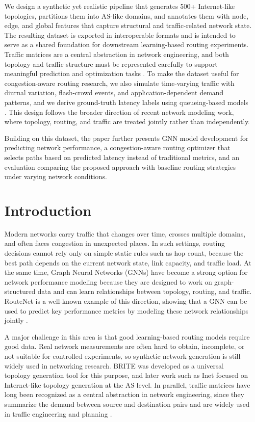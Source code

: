 \documentclass[12pt]{article}
\begin{document}
We design a synthetic yet realistic pipeline that generates 500+ Internet-like topologies, partitions them into AS-like domains, and annotates them with node, edge, and global features that capture structural and traffic-related network state. The resulting dataset is exported in interoperable formats and is intended to serve as a shared foundation for downstream learning-based routing experiments. Traffic matrices are a central abstraction in network engineering, and both topology and traffic structure must be represented carefully to support meaningful prediction and optimization tasks \cite{internetTrafficMatrices}. To make the dataset useful for congestion-aware routing research, we also simulate time-varying traffic with diurnal variation, flash-crowd events, and application-dependent demand patterns, and we derive ground-truth latency labels using queueing-based models \cite{internetTrafficMatrices,mm1}. This design follows the broader direction of recent network modeling work, where topology, routing, and traffic are treated jointly rather than independently. 

Building on this dataset, the paper further presents GNN model development for predicting network performance, a congestion-aware routing optimizer that selects paths based on predicted latency instead of traditional metrics, and an evaluation comparing the proposed approach with baseline routing strategies under varying network conditions. 

\section{Introduction}
Modern networks carry traffic that changes over time, crosses multiple domains, and often faces congestion in unexpected places. In such settings, routing decisions cannot rely only on simple static rules such as hop count, because the best path depends on the current network state, link capacity, and traffic load. At the same time, Graph Neural Networks (GNNs) have become a strong option for network performance modeling because they are designed to work on graph-structured data and can learn relationships between topology, routing, and traffic. RouteNet is a well-known example of this direction, showing that a GNN can be used to predict key performance metrics by modeling these network relationships jointly \cite{routeNet}.

A major challenge in this area is that good learning-based routing models require good data. Real network measurements are often hard to obtain, incomplete, or not suitable for controlled experiments, so synthetic network generation is still widely used in networking research. BRITE \cite{brite} was developed as a universal topology generation tool for this purpose, and later work such as Inet focused on Internet-like topology generation at the AS level. In parallel, traffic matrices have long been recognized as a central abstraction in network engineering, since they summarize the demand between source and destination pairs and are widely used in traffic engineering and planning \cite{internetTrafficMatrices}.
\end{document}
